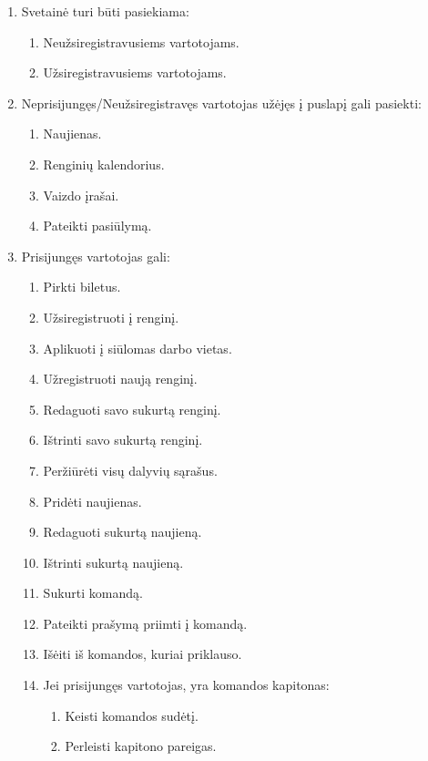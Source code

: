 \documentclass{VUMIFPSkursinis}
\begin{document}
			\begin{enumerate}[label=\textbf{FR\arabic*}]
				\item Svetainė turi būti pasiekiama:
					\begin{enumerate}[label*=\textbf{.\arabic*}]
						\item Neužsiregistravusiems vartotojams.
						\item Užsiregistravusiems vartotojams.
					\end{enumerate}
				\item Neprisijungęs/Neužsiregistravęs vartotojas užėjęs į puslapį gali pasiekti:
					\begin{enumerate}[label*=\textbf{.\arabic*}]
						\item Naujienas.
						\item Renginių kalendorius.
						\item Vaizdo įrašai.
						\item Pateikti pasiūlymą.
					\end{enumerate}	
				\item Prisijungęs vartotojas gali:
					\begin{enumerate}[label*=\textbf{.\arabic*}]
						\item Pirkti biletus.
						\item Užsiregistruoti į renginį.
						\item Aplikuoti į siūlomas darbo vietas.
						\item Užregistruoti naują renginį.
						\item Redaguoti savo sukurtą renginį.
						\item Ištrinti savo sukurtą renginį.
						\item Peržiūrėti visų dalyvių sąrašus.
						\item Pridėti naujienas.
						\item Redaguoti sukurtą naujieną.
						\item Ištrinti sukurtą naujieną.
						\item Sukurti komandą.
						\item Pateikti prašymą priimti į komandą.
						\item Išėiti iš komandos, kuriai priklauso.
						\item Jei prisijungęs vartotojas, yra komandos kapitonas:
						\begin{enumerate}[label*=\textbf{.\arabic*}]
							\item Keisti komandos sudėtį.
							\item Perleisti kapitono pareigas.

\end{enumerate}
\end{enumerate}
\end{enumerate}
\end{document}
